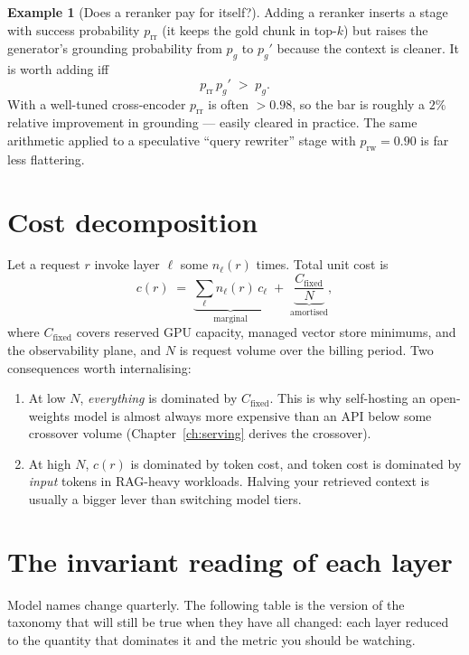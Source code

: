 \documentclass[11pt,twoside,openright]{book}
\theoremstyle{definition}
\newtheorem{example}{Example}[chapter]
\theoremstyle{plain}
\theoremstyle{remark}
\begin{document}
\begin{example}[Does a reranker pay for itself?]
Adding a reranker inserts a stage with success probability $p_{\text{rr}}$
(it keeps the gold chunk in top-$k$) but raises the generator's grounding
probability from $p_g$ to $p_g'$ because the context is cleaner. It is worth
adding iff
\[
  p_{\text{rr}}\, p_g' \;>\; p_g .
\]
With a well-tuned cross-encoder $p_{\text{rr}}$ is often $>0.98$, so the bar is
roughly a $2\%$ relative improvement in grounding --- easily cleared in
practice. The same arithmetic applied to a speculative ``query rewriter'' stage
with $p_{\text{rw}} = 0.90$ is far less flattering.
\end{example}

\section{Cost decomposition}

Let a request $r$ invoke layer $\ell$ some $n_\ell(r)$ times. Total unit cost is
\begin{equation}
  c(r) \;=\; \underbrace{\sum_{\ell} n_\ell(r)\, c_\ell}_{\text{marginal}}
        \;+\; \underbrace{\frac{C_{\text{fixed}}}{N}}_{\text{amortised}} ,
\label{eq:cost}
\end{equation}
where $C_{\text{fixed}}$ covers reserved GPU capacity, managed vector store
minimums, and the observability plane, and $N$ is request volume over the
billing period. Two consequences worth internalising:

\begin{enumerate}[leftmargin=1.6em]
  \item At low $N$, \emph{everything} is dominated by $C_{\text{fixed}}$. This is
        why self-hosting an open-weights model is almost always more expensive
        than an API below some crossover volume (Chapter~\ref{ch:serving}
        derives the crossover).
  \item At high $N$, $c(r)$ is dominated by token cost, and token cost is
        dominated by \emph{input} tokens in RAG-heavy workloads. Halving your
        retrieved context is usually a bigger lever than switching model tiers.
\end{enumerate}

\section{The invariant reading of each layer}

Model names change quarterly. The following table is the version of the
taxonomy that will still be true when they have all changed: each layer reduced
to the quantity that dominates it and the metric you should be watching.
\end{document}
